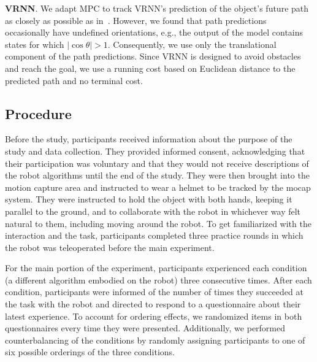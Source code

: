 \textbf{VRNN}.
We adapt MPC to track VRNN's prediction of the object's future path as closely as possible as in~\citet{ng2023takes}. However, we found that path predictions occasionally have undefined orientations, e.g., the output of the model contains states for which $\left|\cos \theta\right| > 1$.
Consequently, we use only the translational component of the path predictions.
Since VRNN is designed to avoid obstacles and reach the goal, we use a running cost based on Euclidean distance to the predicted path and no terminal cost.


\subsection{Procedure}

Before the study, participants received information about the purpose of the study and data collection. They provided informed consent, acknowledging that their participation was voluntary and that they would not receive descriptions of the robot algorithms until the end of the study.
They were then brought into the motion capture area and instructed to wear a helmet to be tracked by the mocap system. They were instructed to hold the object with both hands, keeping it parallel to the ground, and to collaborate with the robot in whichever way felt natural to them, including moving around the robot. To get familiarized with the interaction and the task, participants completed three practice rounds in which the robot was teleoperated before the main experiment.

For the main portion of the experiment, participants experienced each condition (a different algorithm embodied on the robot) three consecutive times. After each condition, participants were informed of the number of times they succeeded at the task with the robot and directed to respond to a questionnaire about their latest experience.
To account for ordering effects, we randomized items in both questionnaires every time they were presented.
Additionally, we performed counterbalancing of the conditions by randomly assigning participants to one of six possible orderings of the three conditions.

\begin{table}
\centering
\caption{Summary of objective metrics. Success rate is calculated out of 72 total trials for each algorithm. Mean and standard deviation of Time and Acceleration consider only successful trials.\label{table:h1}}
\end{table}


